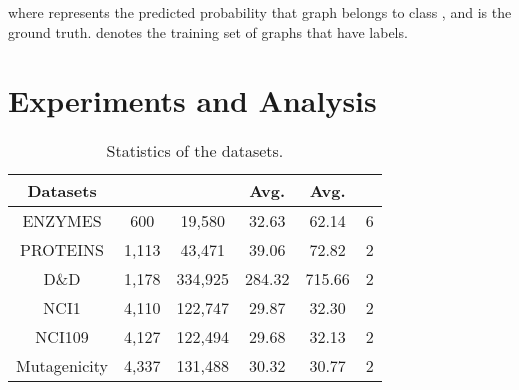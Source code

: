\documentclass[letterpaper]{article} \usepackage{aaai20}  \usepackage{times}  \usepackage{helvet} \usepackage{courier}  \usepackage[hyphens]{url}  \usepackage{graphicx} \urlstyle{rm} \def\UrlFont{\rm}  \usepackage{graphicx}  \frenchspacing  \setlength{\pdfpagewidth}{8.5in}  \setlength{\pdfpageheight}{11in}
\begin{document}
where  represents the predicted probability that graph  belongs to class , and  is the ground truth.  denotes the training set of graphs that have labels.

\section{Experiments and Analysis}
\begin{table}[t]
    \centering
    \small
    \resizebox{.95\columnwidth}{!}
    {
    	\begin{tabular}{ c|c|c|c|c|c }
    	\hline
    	Datasets  	&  & 	& Avg. 	& Avg. 	& 	\\
    	\hline	
    	ENZYMES     &   600   	  		& 19,580			&  32.63				& 62.14    				& 6 		\\
    	PROTEINS    &   1,113     		& 43,471			&  39.06				& 72.82   				& 2 		\\
    	D\&D		&	1,178	 		& 334,925			&  284.32				& 715.66				& 2 		\\
    	NCI1     	&   4,110    		& 122,747			&  29.87				& 32.30   				& 2 		\\
    	NCI109		&	4,127			& 122,494			&  29.68				& 32.13					& 2 		\\
   		Mutagenicity&	4,337			& 131,488			&  30.32  			 	& 30.77					& 2			\\
    	\hline
    	\end{tabular}
    }
    \caption{Statistics of the datasets.}
    \label{tab:datasets}
\end{table}
\end{document}
